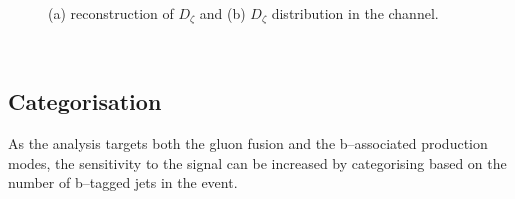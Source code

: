 \begin{figure}[h!]
\begin{center}
\end{center}
\caption{(a) reconstruction of $D_{\zeta}$ \cite{cdf-dzeta} and (b) $D_{\zeta}$ distribution in the 
\emu channel\cite{CMS-PAS-HIG-16-037}.}
\label{fig:mssm_dzeta}
\end{figure}
~\clearpage
\subsection{Categorisation}
\label{sec:mssm_eventsel_categories}
As the analysis targets both the gluon fusion
and the b--associated production modes, 
the sensitivity to the signal can be increased by categorising
based on the number of b--tagged jets in the event.

